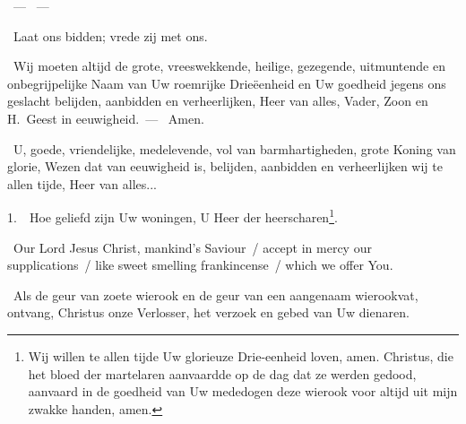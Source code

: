 \documentclass[12pt,twoside,a5paper]{article}
\begin{document}
\begin{halfparskip}
\end{halfparskip}

\begin{halfparskip}

  ~--- ~--- 
\end{halfparskip}

\begin{halfparskip}
  \dd~Laat ons bidden; vrede zij met ons.

   \cc~Wij moeten altijd de grote, vreeswekkende, heilige, gezegende, uitmuntende en onbegrijpelijke Naam van Uw roemrijke Drieëenheid en Uw goedheid jegens ons geslacht belijden, aanbidden
  en verheerlijken, Heer van alles, Vader, Zoon en H.~Geest in eeuwigheid.~--- \rr~Amen.

   \cc~U, goede, vriendelijke, medelevende, vol van barmhartigheden, grote Koning van glorie, Wezen dat van eeuwigheid is, belijden, aanbidden en verheerlijken wij te allen tijde, Heer van alles...
\end{halfparskip}



\vspace{0.5em}

\begin{halfparskip}

  1.~\dd~Hoe geliefd zijn Uw woningen, U Heer der heerscharen\footnote{ Wij willen te allen tijde Uw glorieuze Drie-eenheid loven, amen.  Christus, die het bloed der martelaren aanvaardde op de dag dat ze werden gedood, aanvaard in de goedheid van Uw mededogen deze wierook voor altijd uit mijn zwakke handen, amen.}.
\end{halfparskip}

\CLEARPAGEAV


\begin{doublecols}
  \englishl \rr~Our Lord Jesus Christ, mankind's Saviour~/ accept in mercy our supplications~/ like sweet smelling frankincense~/ which we offer You.

   \rr~Als de geur van zoete wierook en de geur van een aangenaam wierookvat, ontvang, Christus onze Verlosser, het verzoek en gebed van Uw dienaren.
\end{doublecols}
\end{document}
